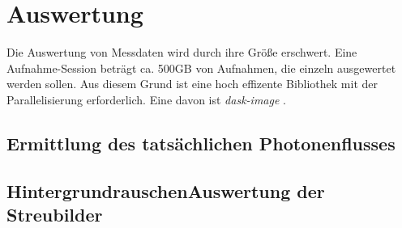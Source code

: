 \chapter{Auswertung}
Die Auswertung von Messdaten wird durch ihre Größe erschwert. Eine Aufnahme-Session beträgt ca. 500GB von Aufnahmen, die einzeln ausgewertet werden sollen. Aus diesem Grund ist eine hoch effizente Bibliothek mit der Parallelisierung erforderlich. Eine davon ist \textit{dask-image} \cite{dask-library}.
%     

\section{Ermittlung des tatsächlichen Photonenflusses}
\label{text:butterfly_counting}

\section{HintergrundrauschenAuswertung der Streubilder}